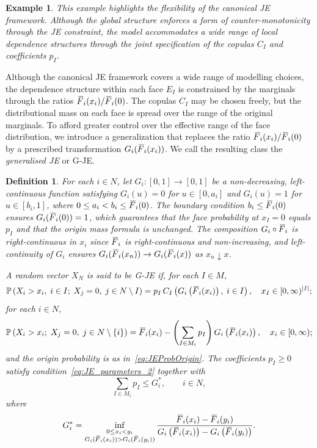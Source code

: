 \documentclass[letterpaper,12pt]{article}
\def \P {\mathbb{P}}
\numberwithin{equation}{section}
\newtheorem{definition}[theorem]{Definition}
\newtheorem{example}[theorem]{Example}
\newcommand{\N}{{N}}
\newcommand{\M}{{M}}
\newcommand{\I}{{I}}
\newcommand{\F}{\,\overline{\kern-0.175em F\kern-0em}}
\begin{document}
{\begin{example}
\medskip
This example highlights the flexibility of the canonical JE framework. Although
the global structure enforces a form of counter-monotonicity through the JE
constraint, the model accommodates a wide range of local dependence structures
through the joint specification of the copulas $C_{\I}$ and coefficients $p_{\I}$.
\end{example}

Although the canonical JE framework covers a wide range of modelling choices,
the dependence structure within each face $E_{\I}$ is constrained by the marginals
through the ratios $\F_i(x_i)/\F_i(0)$. The copulas $C_\I$ may be chosen freely,
but the distributional mass on each face is spread over the range of the original
marginals. To afford greater control over the effective range of the face
distribution, we introduce a generalization that replaces the ratio
$\F_i(x_i)/\F_i(0)$ by a prescribed transformation $G_i(\F_i(x_i))$. We call
the resulting class the \emph{generalised JE} or G-JE.

\begin{definition}
\label{def:g-JE}
For each $i\in\N$, let $G_i:[0,1]\to[0,1]$ be a non-decreasing, left-continuous
function satisfying $G_i(u)=0$ for $u\in[0,a_i]$ and $G_i(u)=1$ for
$u\in[b_i,1]$, where $0\le a_i<b_i\le\F_i(0)$. The boundary condition
$b_i\le\F_i(0)$ ensures $G_i(\F_i(0))=1$, which guarantees that the face
probability at $x_\I=0$ equals $p_\I$ and that the origin mass formula is
unchanged. The composition $G_i\circ\F_i$ is right-continuous in $x_i$ since
$\F_i$ is right-continuous and non-increasing, and left-continuity of $G_i$
ensures $G_i(\F_i(x_n))\to G_i(\F_i(x))$ as $x_n\downarrow x$.

A random vector $X_{\N}$ is said to be \emph{G-JE} if, for each $\I\in\M$,
\begin{equation}
\label{eq:G-JEProbFaces}
\P\left(X_i>x_i,\;i\in \I;\;X_j=0,\;j\in\N\setminus \I\right)
= p_{\I}\,C_{\I}\left(G_i\left(\F_i(x_i)\right),\;i\in\I\right),
\quad x_{\I}\in[0,\infty)^{|\I|};
\end{equation}
for each $i\in\N$,
\begin{equation}
\label{eq:G-JEProbAxes}
\P\left(X_i>x_i;\;X_j=0,\;j\in\N\setminus\{i\}\right)
=\F_i(x_i)-\left(\sum_{\I\in \M_i}p_{\I}\right)G_i\left(\F_i(x_i)\right),
\quad x_i\in[0,\infty);
\end{equation}
and the origin probability is as in~\eqref{eq:JEProbOrigin}. The coefficients
$p_\I\ge0$ satisfy condition~\eqref{eq:JE_parameters_2} together with
\begin{equation}
\label{eq:G-JE_parameters_1}
\sum_{\I\in \M_i}p_{\I}\le G_i^*, \qquad i\in\N,
\end{equation}
where
\begin{equation}
\label{eq:G-JE_G_star}
G_i^*=\inf_{\substack{0\le x_i<y_i\\
G_i(\F_i(x_i))>G_i(\F_i(y_i))}}
\frac{\F_i(x_i)-\F_i(y_i)}{G_i\left(\F_i(x_i)\right)-G_i\left(\F_i(y_i)\right)}.
\end{equation}
\end{definition}

}
\end{document}
